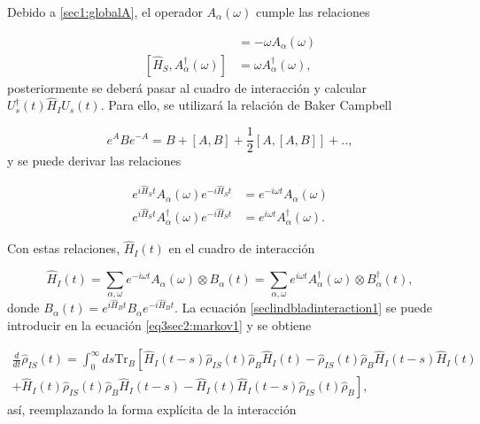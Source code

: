 Debido a \ref{sec1:globalA}, el operador $A_{\alpha}(\omega)$ cumple las relaciones

\begin{align*}
    [\hat{H}_{S},A_{\alpha}(\omega)] & = - \omega A_{\alpha}(\omega) \\
    [\hat{H}_{S},A^{\dagger}_{\alpha}(\omega)] & = \omega A^{\dagger}_{\alpha}(\omega),
\end{align*}
posteriormente se deberá pasar al cuadro de interacción y calcular $U^{\dagger}_{s}(t)\hat{H}_{I}U_{s}(t)$. Para ello, se utilizará la relación de Baker Campbell

\begin{equation}
    e^{A}Be^{-A} = B  + [A,B] + \frac{1}{2}[A,[A,B]] +..,
    \label{sec2lind:baker}
\end{equation}
y se puede derivar las relaciones 

\begin{align*}
    e^{i\hat{H}_{S}t}A_{\alpha}(\omega) e^{-i\hat{H}_{S}t} & = e^{-i\omega t} A_{\alpha}(\omega) \\
    e^{i\hat{H}_{S}t}A^{\dagger}_{\alpha}(\omega) e^{-i\hat{H}_{S}t} & = e^{i\omega t} A^{\dagger}_{\alpha}(\omega).
\end{align*}

Con estas relaciones, $\hat{H}_{I}(t)$ en el cuadro de interacción

\begin{equation}
    \hat{H}_{I}(t) = \sum_{\alpha,\omega}e^{-i\omega t}A_{\alpha}(\omega) \otimes B_{\alpha}(t) = \sum_{\alpha,\omega}e^{i\omega t}A^{\dagger}_{\alpha}(\omega) \otimes B^{\dagger}_{\alpha}(t),
    \label{seclindbladinteraction1}
\end{equation}
donde $B_{\alpha}(t) = e^{i\hat{H}_{B}t}B_{\alpha}e^{-i\hat{H}_{B}t}$. La ecuación \ref{seclindbladinteraction1} se puede introducir en la ecuación \ref{eq3sec2:markov1} y se obtiene 

\begin{align*}
    \frac{d}{dt}\hat{\rho}_{IS}(t) = \int_{0}^{\infty} ds \text{Tr}_{B}\left[  \hat{H}_{I}(t-s)\hat{\rho}_{IS}(t)\hat{\rho}_{B}\hat{H}_{I}(t) - \hat{\rho}_{IS}(t)\hat{\rho}_{B}\hat{H}_{I}(t-s)\hat{H}_{I}(t)    \right.\\
    \left. + \hat{H}_{I}(t)\hat{\rho}_{IS}(t)\hat{\rho}_{B}\hat{H}_{I}(t-s) -  \hat{H}_{I}(t)\hat{H}_{I}(t-s)\hat{\rho}_{IS}(t)\hat{\rho}_{B}  \right],
\end{align*}
así, reemplazando la forma explícita de la interacción  

